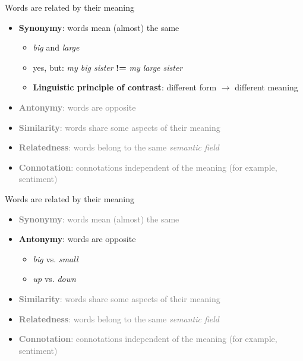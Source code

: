 \documentclass{beamer}
\begin{document}
\begin{frame}{Words are related by their meaning}
  \begin{itemize}
      \item \textbf{Synonymy}: words mean (almost) the same 
      \begin{itemize}
          \item \textit{big} and \textit{large}
          \item yes, but: \textit{my big sister} \textbf{!=} \textit{my large sister}
          \item \textbf{Linguistic principle of contrast}: different form $\rightarrow$ different meaning
      \end{itemize}
      \item \textcolor{gray}{\textbf{Antonymy}: words are opposite}
      \item \textcolor{gray}{\textbf{Similarity}: words share some aspects of their meaning}
      \item \textcolor{gray}{\textbf{Relatedness}: words belong to the same \textit{semantic field}}
      \item \textcolor{gray}{\textbf{Connotation}: connotations independent of the meaning (for example, sentiment)}
  \end{itemize}
\end{frame}

\begin{frame}{Words are related by their meaning}
  \begin{itemize}
      \item \textcolor{gray}{\textbf{Synonymy}: words mean (almost) the same }
      \item \textbf{Antonymy}: words are opposite
      \begin{itemize}
          \item \textit{big} vs. \textit{small}
          \item \textit{up} vs. \textit{down}
      \end{itemize}
      \item \textcolor{gray}{\textbf{Similarity}: words share some aspects of their meaning}
      \item \textcolor{gray}{\textbf{Relatedness}: words belong to the same \textit{semantic field}}
      \item \textcolor{gray}{\textbf{Connotation}: connotations independent of the meaning (for example, sentiment)}
  \end{itemize}
\end{frame}
\end{document}
